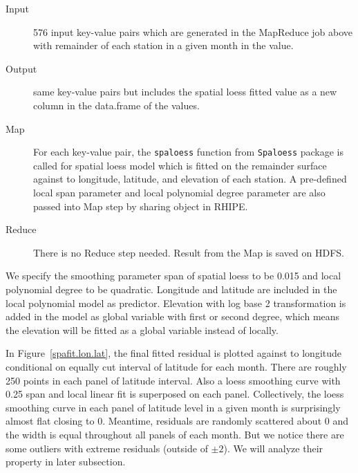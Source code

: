 
\begin{description}
  \item[Input] 576 input key-value pairs which are generated in the MapReduce job
  above with remainder of each station in a given month in the value.
  \item[Output] same key-value pairs but includes the spatial loess fitted value
  as a new column in the data.frame of the values.
  \item[Map] For each key-value pair, the \texttt{spaloess} function from 
  \texttt{Spaloess} package is called for spatial loess model which is fitted on
  the remainder surface against to longitude, latitude, and elevation of each 
  station. A pre-defined local span parameter and local polynomial degree 
  parameter are also passed into Map step by sharing object in RHIPE.  
  \item[Reduce] There is no Reduce step needed. Result from the Map is saved on
  HDFS.
\end{description}

We specify the smoothing parameter span of spatial loess to be 0.015 and local
polynomial degree to be quadratic. Longitude and latitude are included in the 
local polynomial model as predictor. Elevation with log base 2 transformation is
added in the model as global variable with first or second degree, which means 
the elevation will be fitted as a global variable instead of locally. 

In Figure~\href{../plots/a1950/spafit/d2/span0.015/a1950.spaResid.vs.lon.lat.pdf}
{\ref*{spafit.lon.lat}}, the final fitted residual is plotted against to longitude
conditional on equally cut interval of latitude for each month. There are roughly
250 points in each panel of latitude interval. Also a loess smoothing curve with 
0.25 span and local linear fit is superposed on each panel. Collectively, the 
loess smoothing curve in each panel of latitude level in a given month is 
surprisingly almost flat closing to 0. Meantime, residuals are randomly scattered 
about 0 and the width is equal throughout all panels of each month. But we notice 
there are some outliers with extreme residuals (outside of $\pm 2$). We will 
analyze their property in later subsection.

